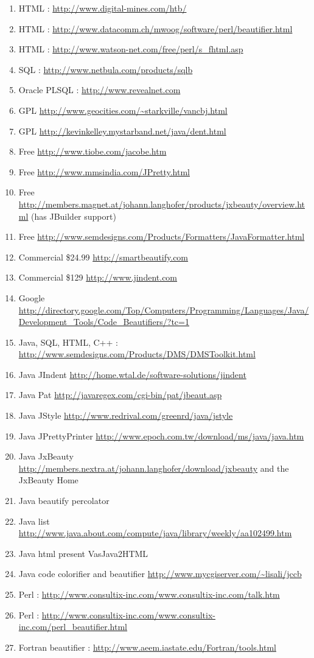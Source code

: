 \begin{sloppypar}
\begin{bluebox}
\begin{enumerate}[leftmargin=*,parsep=0pt]
    \item HTML : \url{http://www.digital-mines.com/htb/}
    \item HTML : \url{http://www.datacomm.ch/mwoog/software/perl/beautifier.html}
    \item HTML : \url{http://www.watson-net.com/free/perl/s_fhtml.asp}
    \item SQL : \url{http://www.netbula.com/products/sqlb}
    \item Oracle PLSQL : \url{http://www.revealnet.com}
    \item GPL \url{http://www.geocities.com/~starkville/vancbj.html}
    \item GPL \url{http://kevinkelley.mystarband.net/java/dent.html}
    \item Free \url{http://www.tiobe.com/jacobe.htm}
    \item Free \url{http://www.mmsindia.com/JPretty.html}
    \item Free \url{http://members.magnet.at/johann.langhofer/products/jxbeauty/overview.html} (has JBuilder support)
    \item Free \url{http://www.semdesigns.com/Products/Formatters/JavaFormatter.html}
    \item Commercial \$24.99 \url{http://smartbeautify.com}
    \item Commercial \$129 \url{http://www.jindent.com}
    \item Google \url{http://directory.google.com/Top/Computers/Programming/Languages/Java/Development_Tools/Code_Beautifiers/?tc=1}
    \item Java, SQL, HTML, C++ : \url{http://www.semdesigns.com/Products/DMS/DMSToolkit.html}
    \item Java JIndent \url{http://home.wtal.de/software-solutions/jindent}
    \item Java Pat \url{http://javaregex.com/cgi-bin/pat/jbeaut.asp}
    \item Java JStyle \url{http://www.redrival.com/greenrd/java/jstyle}
    \item Java JPrettyPrinter \url{http://www.epoch.com.tw/download/ms/java/java.htm}
    \item Java JxBeauty \url{http://members.nextra.at/johann.langhofer/download/jxbeauty} and the JxBeauty Home
    \item Java beautify percolator
    \item Java list \url{http://www.java.about.com/compute/java/library/weekly/aa102499.htm}
    \item Java html present VasJava2HTML
    \item Java code colorifier and beautifier \url{http://www.mycgiserver.com/~lisali/jccb}
    \item Perl : \url{http://www.consultix-inc.com/www.consultix-inc.com/talk.htm}
    \item Perl : \url{http://www.consultix-inc.com/www.consultix-inc.com/perl_beautifier.html}
    \item Fortran beautifier : \url{http://www.aeem.iastate.edu/Fortran/tools.html}


\end{enumerate}
\end{bluebox}
\end{sloppypar}
